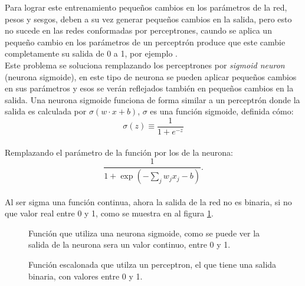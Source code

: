 \documentclass{iccmemoria}
\begin{document}
Para lograr este entrenamiento pequeños cambios en los parámetros de la red, pesos y sesgos, deben a su vez generar pequeños cambios en la salida, pero esto no sucede en las redes conformadas por perceptrones, caundo se aplica un pequeño cambio en los parámetros de un perceptrón produce que este cambie completamente su salida de 0 a 1, por ejemplo \cite{neuralNet}.\\

Este problema se soluciona remplazando los perceptrones por \emph{sigmoid neuron} (neurona sigmoide), en este tipo de neurona se pueden aplicar pequeños cambios en sus parámetros y esos se verán reflejados también en pequeños cambios en la salida. Una neurona sigmoide funciona de forma similar a un perceptrón donde la salida es calculada por $ \sigma(w \cdot x + b)$, $\sigma$ es una función sigmoide, definida cómo:\\

\begin{equation}
	\sigma(z) \equiv \frac{1}{1+e^{-z}}
\end{equation}\\

Remplazando el parámetro de la función por los de la neurona:\\

\begin{equation} 
  \frac{1}{1+\exp(-\sum_j w_j x_j-b)}.
\end{equation}\\


Al ser sigma una función continua, ahora la salida de la red no es binaria, si no que valor real entre 0 y 1, como se muestra en al figura \ref{fig:sigmoid}.\\

\begin{figure}[H]
  \centering
  \begin{small}
  
  \end{small}
  \caption{Función que utiliza una neurona sigmoide, como se puede ver la salida de la neurona sera un valor continuo, entre 0 y 1.}
  \label{fig:sigmoid}
\end{figure}

\begin{figure}[H]
  \centering
  \begin{small}
  
  \end{small}
  \caption{Función escalonada que utilza un perceptron, el que tiene una salida binaria, con valores entre 0 y 1.}
  \label{fig:step}
\end{figure}
\end{document}
